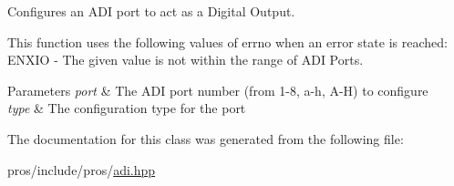 Configures an A\+DI port to act as a Digital Output. 

This function uses the following values of errno when an error state is reached\+: E\+N\+X\+IO -\/ The given value is not within the range of A\+DI Ports.


\begin{DoxyParams}{Parameters}
{\em port} & The A\+DI port number (from 1-\/8, \textquotesingle{}a\textquotesingle{}-\/\textquotesingle{}h\textquotesingle{}, \textquotesingle{}A\textquotesingle{}-\/\textquotesingle{}H\textquotesingle{}) to configure \\
\hline
{\em type} & The configuration type for the port \\
\hline
\end{DoxyParams}


The documentation for this class was generated from the following file\+:\begin{DoxyCompactItemize}
\item 
pros/include/pros/\hyperlink{adi_8hpp}{adi.\+hpp}\end{DoxyCompactItemize}
